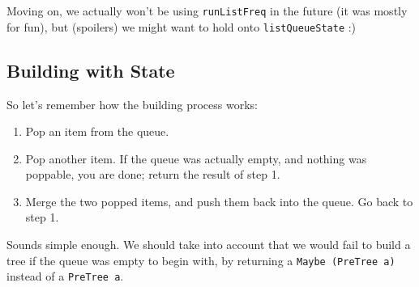 \documentclass[]{article}
\begin{document}
Moving on, we actually won't be using \texttt{runListFreq} in the future (it was
mostly for fun), but (spoilers) we might want to hold onto
\texttt{listQueueState} :)

\subsection{Building with State}\label{building-with-state}

So let's remember how the building process works:

\begin{enumerate}
\def\labelenumi{\arabic{enumi}.}
\tightlist
\item
  Pop an item from the queue.
\item
  Pop another item. If the queue was actually empty, and nothing was poppable,
  you are done; return the result of step 1.
\item
  Merge the two popped items, and push them back into the queue. Go back to step
  1.
\end{enumerate}

Sounds simple enough. We should take into account that we would fail to build a
tree if the queue was empty to begin with, by returning a
\texttt{Maybe\ (PreTree\ a)} instead of a \texttt{PreTree\ a}.
\end{document}
